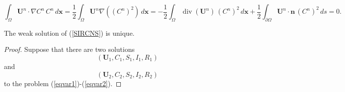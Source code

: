 \documentclass[10pt,a4paper]{amsart}
\begin{document}
		\begin{equation}\label{galc}
\displaystyle \int_\Omega  \boldsymbol{U}^n\cdot\nabla C^n \, C^n \, d\mathbf{x}= \frac{1}{2}\int_\Omega\boldsymbol{U}^n\nabla ((C^n)^2) \, d\mathbf{x}=-\frac{1}{2}\int_\Omega\operatorname{div}(\boldsymbol{U}^n) \, (C^n)^2 \, d\mathbf{x}+\frac{1}{2}\int_{\partial\Omega} \boldsymbol{U}^n\cdot\boldsymbol{n}\,(C^n)^2\,ds=0.
		\end{equation}%

\begin{thm}
		The weak solution of (\ref{SIRCNS}) is unique.
\end{thm}

	\begin{proof}
		Suppose that there are two solutions $$(\boldsymbol{U}_1,  C_1, S_1, I_1, R_1)$$ and 
		$$(\boldsymbol{U}_2, C_2, S_2, I_2, R_2)$$ 
		to the problem (\ref{eqvar1})-(\ref{eqvar2}). 
		

\end{proof}
\end{document}

